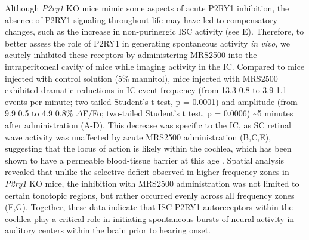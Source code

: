 \documentclass[9pt,lineno]{elife}
\begin{document}
Although \textit{P2ry1} KO mice mimic some aspects of acute P2RY1 inhibition, the absence of P2RY1 signaling throughout life may have led to compensatory changes, such as the increase in non-purinergic ISC activity (see E). Therefore, to better assess the role of P2RY1 in generating spontaneous activity \textit{in vivo}, we acutely inhibited these receptors by administering MRS2500 into the intraperitoneal cavity of mice while imaging activity in the IC. Compared to mice injected with control solution (5\% mannitol), mice injected with MRS2500 exhibited dramatic reductions in IC event frequency (from 13.3 \textpm \hspace{0.2 mm} 0.8 to 3.9 \textpm \hspace{0.2 mm} 1.1 events per minute; two-tailed Student’s t test, p = 0.0001) and amplitude (from 9.9 \textpm \hspace{0.2 mm} 0.5 to 4.9 \textpm \hspace{0.2 mm} 0.8\% $\Delta$F/Fo; two-tailed Student’s t test, p = 0.0006) \textasciitilde 5 minutes after administration (A-D). This decrease was specific to the IC, as SC retinal wave activity \citep{Ackman2012} was unaffected by acute MRS2500 administration (B,C,E), suggesting that the locus of action is likely within the cochlea, which has been shown to have a permeable blood-tissue barrier at this age \citep{Suzuki1998}. Spatial analysis revealed that unlike the selective deficit observed in higher frequency zones in \textit{P2ry1} KO mice, the inhibition with MRS2500 administration was not limited to certain tonotopic regions, but rather occurred evenly across all frequency zones (F,G). Together, these data indicate that ISC P2RY1 autoreceptors within the cochlea play a critical role in initiating spontaneous bursts of neural activity in auditory centers within the brain prior to hearing onset.
\end{document}
